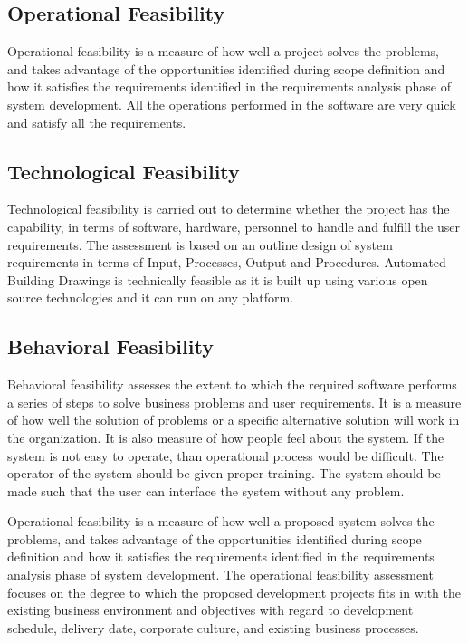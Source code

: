 \subsection{Operational Feasibility}
\noindent Operational feasibility is a measure of how well a project solves the problems, and takes advantage of
the opportunities identified during scope definition and how it satisfies the requirements identified in
the requirements analysis phase of system development. All the operations performed in the software
are very quick and satisfy all the requirements.
\subsection{Technological Feasibility}
\noindent Technological feasibility is carried out to determine whether the project has the capability, in terms
of software, hardware, personnel to handle and fulfill the user requirements. The assessment is based
on an outline design of system requirements in terms of Input, Processes, Output and Procedures.
Automated Building Drawings is technically feasible as it is built up using various open source technologies and it can run on any platform.
\subsection{Behavioral Feasibility}
Behavioral feasibility assesses the extent to which the required software performs a series of steps to solve business problems and user requirements. It is a measure of how well the solution of problems or a specific alternative solution will work in the organization. It is also measure of how people feel about the system. If the system is not easy to operate, than operational process would be difficult. The operator of the system should be given proper training. The system should be made such that the user can interface the system without any problem.

Operational feasibility is a measure of how well a proposed system solves the problems, and takes advantage of the opportunities identified during scope definition and how it satisfies the requirements identified in the requirements analysis phase of system development. The operational feasibility assessment focuses on the degree to which the proposed development projects fits in with the existing business environment and objectives with regard to development schedule, delivery date, corporate culture, and existing business processes.

